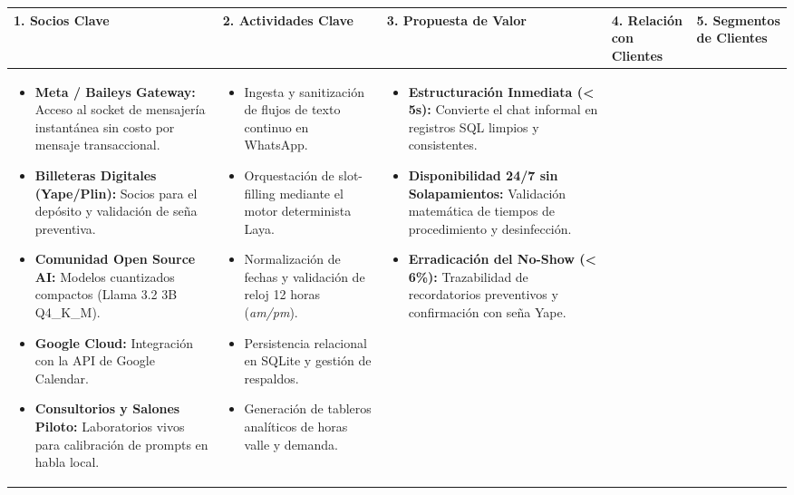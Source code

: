 \documentclass[12pt,a4paper]{report}
\begin{document}
\begin{landscape}
\begin{table}[p]
\centering
\scriptsize
\begin{tabularx}{1.38\textwidth}{|X|X|X|X|X|}
\hline
\rowcolor{BrandPrimary!25}
\textbf{1. Socios Clave} & \textbf{2. Actividades Clave} & \textbf{3. Propuesta de Valor} & \textbf{4. Relación con Clientes} & \textbf{5. Segmentos de Clientes} \\
\hline
\begin{itemize}[leftmargin=0.7em, topsep=1pt, itemsep=1pt]
    \item \textbf{Meta / Baileys Gateway:} Acceso al socket de mensajería instantánea sin costo por mensaje transaccional.
    \item \textbf{Billeteras Digitales (Yape/Plin):} Socios para el depósito y validación de seña preventiva.
    \item \textbf{Comunidad Open Source AI:} Modelos cuantizados compactos (Llama 3.2 3B Q4\_K\_M).
    \item \textbf{Google Cloud:} Integración con la API de Google Calendar.
    \item \textbf{Consultorios y Salones Piloto:} Laboratorios vivos para calibración de prompts en habla local.
\end{itemize}
&
\begin{itemize}[leftmargin=0.7em, topsep=1pt, itemsep=1pt]
    \item Ingesta y sanitización de flujos de texto continuo en WhatsApp.
    \item Orquestación de slot-filling mediante el motor determinista Laya.
    \item Normalización de fechas y validación de reloj 12 horas (\textit{am/pm}).
    \item Persistencia relacional en SQLite y gestión de respaldos.
    \item Generación de tableros analíticos de horas valle y demanda.
\end{itemize}
&
\begin{itemize}[leftmargin=0.7em, topsep=1pt, itemsep=1pt]
    \item \textbf{Estructuración Inmediata (< 5s):} Convierte el chat informal en registros SQL limpios y consistentes.
    \item \textbf{Disponibilidad 24/7 sin Solapamientos:} Validación matemática de tiempos de procedimiento y desinfección.
    \item \textbf{Erradicación del No-Show (< 6\%):} Trazabilidad de recordatorios preventivos y confirmación con seña Yape.

\end{itemize}
\end{tabularx}
\end{table}
\end{landscape}
\end{document}
